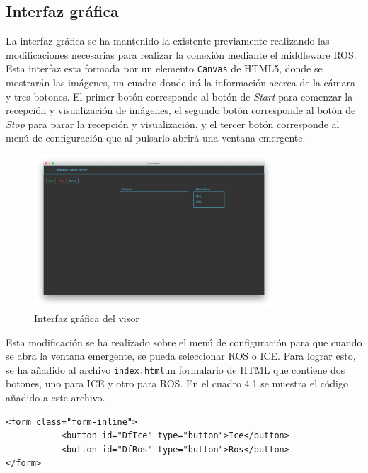 \subsection{Interfaz gráfica}
La interfaz gráfica se ha mantenido la existente previamente realizando las modificaciones necesarias para realizar la conexión mediante el middleware ROS. Esta interfaz esta formada por un elemento \texttt{Canvas} de HTML5, donde se mostrarán las imágenes, un cuadro donde irá la información acerca de la cámara y tres botones. El primer botón corresponde al botón de \textit{Start} para comenzar la recepción y visualización de imágenes, el segundo botón corresponde al botón de \textit{Stop} para parar la recepción y visualización, y el tercer botón corresponde al menú de configuración que al pulsarlo abrirá una ventana emergente.

\begin{figure}[H]
  \begin{center}
    \includegraphics[width=0.8\textwidth]{figures/interfazcamviz.png}
		\caption{Interfaz gráfica del visor}
		\label{fig.iterfazcamviz}
		\end{center}
\end{figure}

Esta modificación se ha realizado sobre el menú de configuración para que cuando se abra la ventana emergente, se pueda seleccionar ROS o ICE. Para lograr esto, se ha añadido al archivo \texttt{index.html}un formulario de HTML que contiene dos botones, uno para ICE y otro para ROS. En el cuadro 4.1 se muestra el código añadido a este archivo.

\begin{lstlisting}[caption= Formulario para añadir al menu de configuración la posibilidad de conectarse mediante ICE o ROS, label=cod.formulariocamviz]
<form class="form-inline">
           <button id="DfIce" type="button">Ice</button>
           <button id="DfRos" type="button">Ros</button>
</form>
\end{lstlisting}

